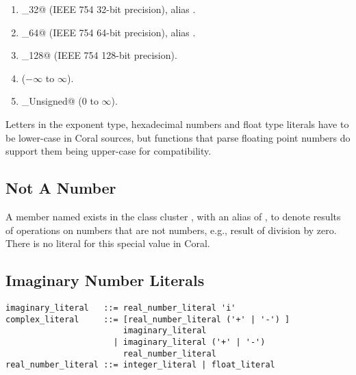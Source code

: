 \begin{enumerate}

  \item \lstinline@Float_32@ (IEEE 754 32-bit precision), alias \lstinline@Float@. 

  \item \lstinline@Float_64@ (IEEE 754 64-bit precision), alias \lstinline@Double@.

  \item \lstinline@Float_128@ (IEEE 754 128-bit precision).

  \item \lstinline@Decimal@ ($-\infty$ to $\infty$).

  \item \lstinline@Decimal_Unsigned@ ($0$ to $\infty$).

\end{enumerate}

Letters in the exponent type, hexadecimal numbers and float type literals have to be lower-case in Coral sources, but functions that parse floating point numbers do support them being upper-case for compatibility. 





\subsection{Not A Number}
\label{sec:nan}

A member named  exists in the class cluster , with an alias of , to denote results of operations on numbers that are not numbers, e.g., result of division by zero. There is no literal for this special value in Coral. 






\subsection{Imaginary Number Literals}
\label{sec:imaginaryliterals}

\syntax\begin{lstlisting}
imaginary_literal   ::= real_number_literal 'i'
complex_literal     ::= [real_number_literal ('+' | '-') ]
                        imaginary_literal
	                  | imaginary_literal ('+' | '-') 
	                    real_number_literal
real_number_literal ::= integer_literal | float_literal
\end{lstlisting}

